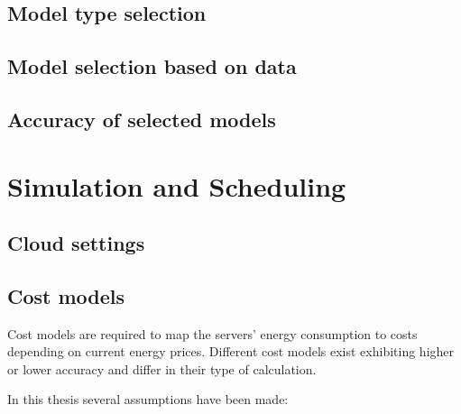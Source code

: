 \subsection{Model type selection}

\subsection{Model selection based on data}

\subsection{Accuracy of selected models}


\section{Simulation and Scheduling}

\subsection{Cloud settings}

\subsection{Cost models}


Cost models are required to map the servers' energy consumption to costs depending on current energy prices. Different cost models exist exhibiting higher or lower accuracy and differ in their type of calculation. 

In this thesis several assumptions have been made: 


